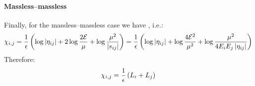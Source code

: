 \paragraph{Massless--massless}

Finally, for the massless--massless case we have , i.e.:
\begin{equation*}
    \chi_{i,j} = \frac{1}{\epsilon} \left( \log \left\lvert\eta_{ij}\right\rvert + 2 \log \frac{2\mathcal{E}}{\mu} + \log \frac{\mu^2}{\left\lvert s_{ij}\right\rvert} \right) = \frac{1}{\epsilon} \left( \log \left\lvert\eta_{ij}\right\rvert + \log \frac{4\mathcal{E}^2}{\mu^2} + \log \frac{\mu^2}{4 E_i E_j \left\lvert\eta_{ij}\right\rvert} \right)
\end{equation*}
Therefore:
\begin{equation}
  \chi_{i,j} = \frac{1}{\epsilon} \left( L_i + L_j \right)
  \label{eq:ci-nmnm}
\end{equation}










